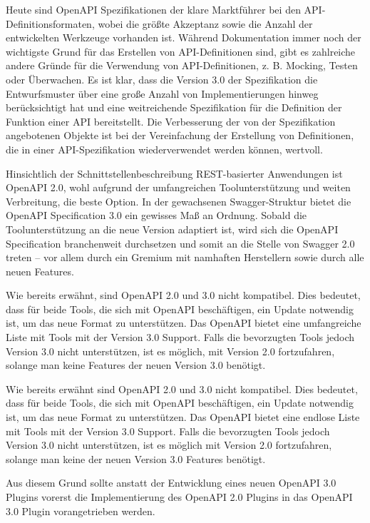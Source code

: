 Heute sind OpenAPI Spezifikationen der klare Marktführer bei den API-Definitionsformaten, wobei die größte Akzeptanz sowie die Anzahl der entwickelten Werkzeuge vorhanden ist. Während Dokumentation immer noch der wichtigste Grund für das Erstellen von API-Definitionen sind, gibt es zahlreiche andere Gründe für die Verwendung von API-Definitionen, z. B. Mocking, Testen oder Überwachen. Es ist klar, dass die Version 3.0 der Spezifikation die Entwurfsmuster über eine große Anzahl von Implementierungen hinweg berücksichtigt hat und eine weitreichende Spezifikation für die Definition der Funktion einer API bereitstellt. Die Verbesserung der von der Spezifikation angebotenen Objekte ist bei der Vereinfachung der Erstellung von Definitionen, die in einer API-Spezifikation wiederverwendet werden können, wertvoll.

Hinsichtlich der Schnittstellenbeschreibung REST-basierter Anwendungen ist OpenAPI 2.0, wohl aufgrund der umfangreichen Toolunterstützung und weiten Verbreitung, die beste Option. In der gewachsenen Swagger-Struktur bietet die OpenAPI Specification 3.0 ein gewisses Maß an Ordnung. Sobald die Toolunterstützung an die neue Version adaptiert ist, wird sich die OpenAPI Specification branchenweit durchsetzen und somit an die Stelle von Swagger 2.0 treten – vor allem durch ein Gremium mit namhaften Herstellern sowie durch alle neuen Features.

Wie bereits erwähnt, sind OpenAPI 2.0 und 3.0 nicht kompatibel. Dies bedeutet, dass für beide Tools, die sich mit OpenAPI beschäftigen, ein Update notwendig ist, um das neue Format zu unterstützen. Das OpenAPI bietet eine umfangreiche Liste mit Tools mit der Version 3.0 Support. Falls die bevorzugten Tools jedoch Version 3.0 nicht unterstützen, ist es möglich, mit Version 2.0 fortzufahren, solange man keine Features der neuen Version 3.0 benötigt.

Wie bereits erwähnt sind OpenAPI 2.0 und 3.0 nicht kompatibel. Dies bedeutet, dass für beide Tools, die sich mit OpenAPI beschäftigen, ein Update notwendig ist, um das neue Format zu unterstützen. Das OpenAPI bietet eine endlose Liste mit Tools mit der Version 3.0 Support. Falls die bevorzugten Tools jedoch Version 3.0 nicht unterstützen, ist es möglich mit Version 2.0 fortzufahren, solange man keine der neuen Version 3.0 Features benötigt.

Aus diesem Grund sollte anstatt der Entwicklung eines neuen OpenAPI 3.0 Plugins vorerst die Implementierung des OpenAPI 2.0 Plugins in das OpenAPI 3.0 Plugin vorangetrieben werden.






